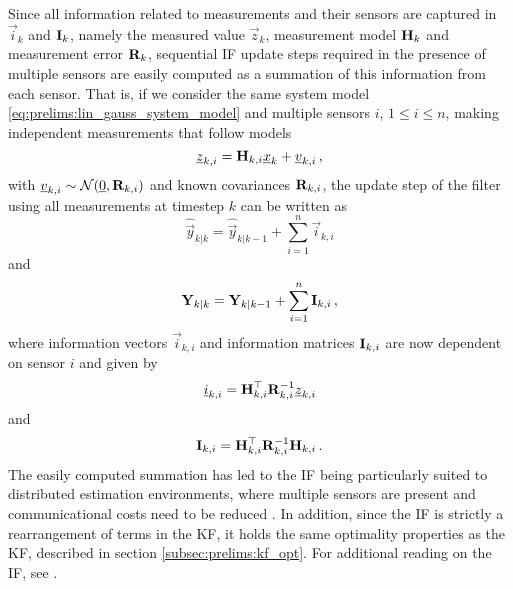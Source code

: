 Since all information related to measurements and their sensors are captured in $\vec{i}_k$ and ${{\mathbf{I}}}_k$, namely the measured value $\vec{z}_k$, measurement model ${{\mathbf{H}}}_k$ and measurement error ${{\mathbf{R}}}_k$, sequential IF update steps required in the presence of multiple sensors are easily computed as a summation of this information from each sensor. That is, if we consider the same system model \eqref{eq:prelims:lin_gauss_system_model} and multiple sensors $i$, $1\leq i\leq n$, making independent measurements that follow models
\begin{equation}
    {\underline{z}}_{k,i} = {{\mathbf{H}}}_{k,i} {\underline{x}}_k + {\underline{v}}_{k,i}\,,
\end{equation}
with ${\underline{v}}_{k, i}\sim\mathcal{N}({\underline{0}},{{\mathbf{R}}}_{k, i})$ and known covariances ${{\mathbf{R}}}_{k, i}$, the update step of the filter using all measurements at timestep $k$ can be written as
\begin{equation}\label{eq:prelims:if_info_vec_update}
    \hat{\vec{y}}_{k|k} = \hat{\vec{y}}_{k|k-1} + \sum_{i=1}^n\vec{i}_{k,i}
\end{equation}
and
\begin{equation}\label{eq:prelims:if_info_mat_update}
    {\ensuremath{{\mathbf{Y}}}}_{k|k} = {{\mathbf{Y}}}_{k|k-1} + \sum_{i=1}^n{{\mathbf{I}}}_{k,i}\,,
\end{equation}
where information vectors $\vec{i}_{k,i}$ and information matrices ${{\mathbf{I}}}_{k,i}$ are now dependent on sensor $i$ and given by
\begin{equation}\label{eq:prelims:if_measurement_vec_defn}
    {\underline{i}}_{k,i} = {{\mathbf{H}}}_{k,i}^\top{\ensuremath{{\mathbf{R}}}}_{k,i}^{-1}{\underline{z}}_{k,i}
\end{equation}
and
\begin{equation}\label{eq:prelims:if_measurement_mat_defn}
    {\ensuremath{{\mathbf{I}}}}_{k,i} = {{\mathbf{H}}}_{k,i}^\top{\ensuremath{{\mathbf{R}}}}_{k,i}^{-1}{{\mathbf{H}}}_{k,i}\,.
\end{equation}
The easily computed summation has led to the IF being particularly suited to distributed estimation environments, where multiple sensors are present and communicational costs need to be reduced \cite{pfaffInformationFormDistributed2017,chandraCubatureInformationFilter2016,assimakisInformationFilterKalman2012,reinhardtDistributedKalmanFiltering2014}. In addition, since the IF is strictly a rearrangement of terms in the KF, it holds the same optimality properties as the KF, described in section \ref{subsec:prelims:kf_opt}. For additional reading on the IF, see \cite[Chap. 6]{simonOptimalStateEstimation2006}.

% 
% 

